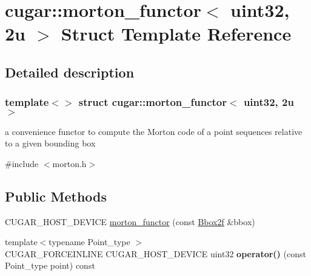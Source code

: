 \hypertarget{structcugar_1_1morton__functor_3_01uint32_00_012u_01_4}{}\section{cugar\+:\+:morton\+\_\+functor$<$ uint32, 2u $>$ Struct Template Reference}
\label{structcugar_1_1morton__functor_3_01uint32_00_012u_01_4}


\subsection{Detailed description}
\subsubsection*{template$<$$>$\newline
struct cugar\+::morton\+\_\+functor$<$ uint32, 2u $>$}

a convenience functor to compute the Morton code of a point sequences relative to a given bounding box 

{\ttfamily \#include $<$morton.\+h$>$}

\subsection*{Public Methods}
\begin{DoxyCompactItemize}
\item 
C\+U\+G\+A\+R\+\_\+\+H\+O\+S\+T\+\_\+\+D\+E\+V\+I\+CE \hyperlink{structcugar_1_1morton__functor_3_01uint32_00_012u_01_4_a430c9e026c07cc94ad8c13dd6f8ce145}{morton\+\_\+functor} (const \hyperlink{structcugar_1_1_bbox}{Bbox2f} \&bbox)
\item 
\mbox{\label{structcugar_1_1morton__functor_3_01uint32_00_012u_01_4_a70aa094ca0c011ab897319a81de9e97d}} 
{\footnotesize template$<$typename Point\+\_\+type $>$ }\\C\+U\+G\+A\+R\+\_\+\+F\+O\+R\+C\+E\+I\+N\+L\+I\+NE C\+U\+G\+A\+R\+\_\+\+H\+O\+S\+T\+\_\+\+D\+E\+V\+I\+CE uint32 {\bfseries operator()} (const Point\+\_\+type point) const
\end{DoxyCompactItemize}
